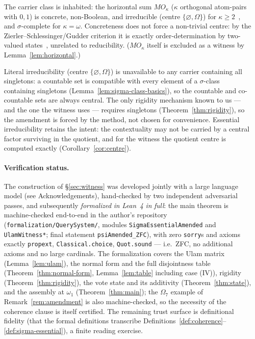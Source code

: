 \begin{remark}\label{rem:offcenter}
The carrier class is inhabited: the horizontal sum $MO_\kappa$ ($\kappa$ orthogonal
atom-pairs with $0,1$) is concrete, non-Boolean, and irreducible
(centre $\{\varnothing,\Omega\}$) for $\kappa\geq 2$~\cite{Kalmbach1983}, and
$\sigma$-complete for $\kappa=\omega$. Concreteness does not force a non-trivial
centre: by the Zierler--Schlessinger/Gudder criterion it is exactly order-determination
by two-valued states~\cite{Gudder1969,Harding2004}, unrelated to reducibility. ($MO_\kappa$
itself is excluded as a witness by Lemma~\ref{lem:horizontal}.)
\end{remark}

\begin{remark}\label{rem:irreducibility-amended}
Literal irreducibility (centre $\{\varnothing,\Omega\}$) is unavailable to any
carrier containing all singletons: a countable set is compatible with every
element of a $\sigma$-class containing singletons
(Lemma~\ref{lem:sigma-class-basics}), so the countable and co-countable sets are
always central. The only rigidity mechanism known to us --- and the one the
witness uses --- requires singletons (Theorem~\ref{thm:rigidity}), so the
amendment is forced by the method, not chosen for convenience. Essential
irreducibility retains the intent: the contextuality may not be carried by a
central factor surviving in the quotient, and for the witness the quotient centre
is computed exactly (Corollary~\ref{cor:centre}).
\end{remark}

\paragraph{Verification status.}
The construction of \S\ref{sec:witness} was developed jointly with a large
language model (see Acknowledgements), hand-checked by two independent
adversarial passes, and subsequently \emph{formalized in Lean~4 in full}: the
main theorem is machine-checked end-to-end in the author's repository
(\texttt{formalization/QuerySystem/}, modules \texttt{SigmaEssentialAmended}
and \texttt{UlamWitness*}; final statement \texttt{psiAmended\_ZFC}), with zero
\texttt{sorry}s and axioms exactly \texttt{propext},
\texttt{Classical.choice}, \texttt{Quot.sound} --- i.e.\ ZFC, no additional
axioms and no large cardinals. The formalization covers the Ulam matrix
(Lemma~\ref{lem:ulam}), the normal form and the full disjointness table
(Theorem~\ref{thm:normal-form}, Lemma~\ref{lem:table} including case (IV)),
rigidity (Theorem~\ref{thm:rigidity}), the vote state and its additivity
(Theorem~\ref{thm:state}), and the assembly at $\omega_1$
(Theorem~\ref{thm:main}); the $\Omega_7$ example of
Remark~\ref{rem:amendment} is also machine-checked, so the necessity of the
coherence clause is itself certified. The remaining trust surface is
definitional fidelity (that the formal definitions transcribe
Definitions~\ref{def:coherence}--\ref{def:sigma-essential}), a finite reading
exercise.


